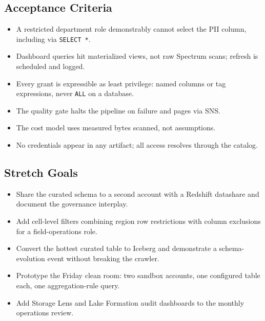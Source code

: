 \subsection*{Acceptance Criteria}
\begin{itemize}
    \item A restricted department role demonstrably cannot select the PII column, including via \texttt{SELECT *}.
    \item Dashboard queries hit materialized views, not raw Spectrum scans; refresh is scheduled and logged.
    \item Every grant is expressible as least privilege: named columns or tag expressions, never \texttt{ALL} on a database.
    \item The quality gate halts the pipeline on failure and pages via SNS.
    \item The cost model uses measured bytes scanned, not assumptions.
    \item No credentials appear in any artifact; all access resolves through the catalog.
\end{itemize}

\subsection*{Stretch Goals}
\begin{itemize}
    \item Share the curated schema to a second account with a Redshift datashare and document the governance interplay.
    \item Add cell-level filters combining region row restrictions with column exclusions for a field-operations role.
    \item Convert the hottest curated table to Iceberg and demonstrate a schema-evolution event without breaking the crawler.
    \item Prototype the Friday clean room: two sandbox accounts, one configured table each, one aggregation-rule query.
    \item Add Storage Lens and Lake Formation audit dashboards to the monthly operations review.
\end{itemize}
